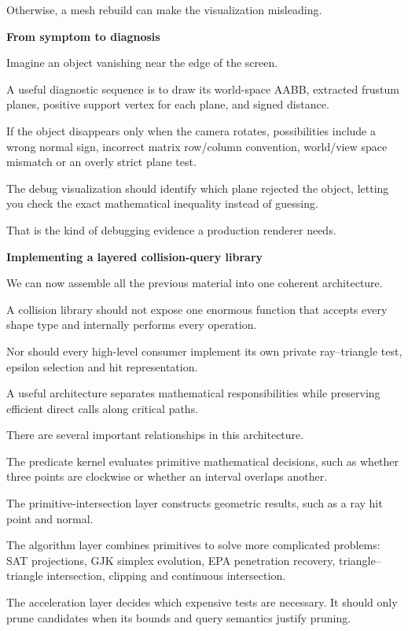 Otherwise, a mesh rebuild can make the visualization misleading.

\textbf{From symptom to diagnosis}

Imagine an object vanishing near the edge of the screen.

A useful diagnostic sequence is to draw its world-space AABB, extracted frustum planes, positive support vertex for each plane, and signed distance.

If the object disappears only when the camera rotates, possibilities include a wrong normal sign, incorrect matrix row/column convention, world/view space mismatch or an overly strict plane test.

The debug visualization should identify which plane rejected the object, letting you check the exact mathematical inequality instead of guessing.

That is the kind of debugging evidence a production renderer needs.

\textbf{Implementing a layered collision-query library}

We can now assemble all the previous material into one coherent architecture.

A collision library should not expose one enormous function that accepts every shape type and internally performs every operation.

Nor should every high-level consumer implement its own private ray--triangle test, epsilon selection and hit representation.

A useful architecture separates mathematical responsibilities while preserving efficient direct calls along critical paths.

There are several important relationships in this architecture.

The predicate kernel evaluates primitive mathematical decisions, such as whether three points are clockwise or whether an interval overlaps another.

The primitive-intersection layer constructs geometric results, such as a ray hit point and normal.

The algorithm layer combines primitives to solve more complicated problems: SAT projections, GJK simplex evolution, EPA penetration recovery, triangle--triangle intersection, clipping and continuous intersection.

The acceleration layer decides which expensive tests are necessary. It should only prune candidates when its bounds and query semantics justify pruning.

